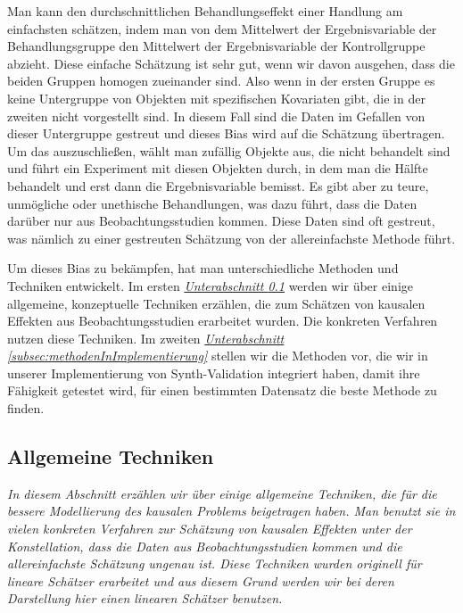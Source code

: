 \documentclass[12pt,a4paper,twoside]{scrartcl}
\numberwithin{equation}{section}
\begin{document}
Man kann den durchschnittlichen Behandlungseffekt einer Handlung am einfachsten schätzen, indem man von dem Mittelwert der Ergebnisvariable der Behandlungsgruppe den Mittelwert der Ergebnisvariable der Kontrollgruppe abzieht. Diese einfache Schätzung ist sehr gut, wenn wir davon ausgehen, dass die beiden Gruppen homogen zueinander sind. Also wenn in der ersten Gruppe es keine Untergruppe von Objekten mit spezifischen Kovariaten gibt, die in der zweiten nicht vorgestellt sind. In diesem Fall sind die Daten im Gefallen von dieser Untergruppe gestreut und dieses Bias wird auf die Schätzung übertragen. Um das auszuschließen, wählt man zufällig Objekte aus, die nicht behandelt sind und führt ein Experiment mit diesen Objekten durch, in dem man die Hälfte behandelt und erst dann die Ergebnisvariable bemisst. Es gibt aber zu teure, unmögliche oder unethische Behandlungen, was dazu führt, dass die Daten darüber nur aus Beobachtungsstudien kommen. Diese Daten sind oft gestreut, was nämlich zu einer gestreuten Schätzung von der allereinfachste Methode führt\cite{cox1982biometrics}.\par 

\noindent
Um dieses Bias zu bekämpfen, hat man unterschiedliche Methoden und Techniken entwickelt. Im ersten  \emph{\hyperref[subsec:allgemeineTechniken]{Unterabschnitt \ref{subsec:allgemeineTechniken}}} werden wir über einige allgemeine, konzeptuelle Techniken erzählen, die zum Schätzen von kausalen Effekten aus Beobachtungsstudien erarbeitet wurden. Die konkreten Verfahren nutzen diese Techniken. Im zweiten \emph{\hyperref[subsec:methodenInImplementierung]{Unterabschnitt \ref{subsec:methodenInImplementierung}}} stellen wir die Methoden vor, die wir in unserer Implementierung von Synth-Validation integriert haben, damit ihre Fähigkeit getestet wird, für einen bestimmten Datensatz die beste Methode zu finden.\par 
  
\subsection{Allgemeine Techniken}\label{subsec:allgemeineTechniken} 
\noindent
\emph{In diesem Abschnitt erzählen wir über einige allgemeine Techniken, die für die bessere Modellierung des kausalen Problems beigetragen haben. Man benutzt sie in vielen konkreten Verfahren zur Schätzung von kausalen Effekten unter der Konstellation, dass die Daten aus Beobachtungsstudien kommen und die allereinfachste Schätzung ungenau ist. Diese Techniken wurden originell für lineare Schätzer erarbeitet und aus diesem Grund werden wir bei deren Darstellung hier einen linearen Schätzer benutzen.}
\par
 
\end{document}
